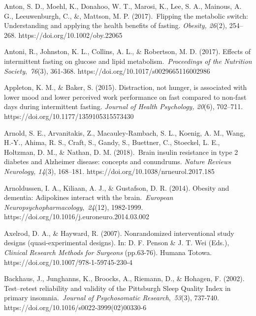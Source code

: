 \documentclass[authordate, empirical]{jote-new-article}
\begin{document}
Anton, S. D., Moehl, K., Donahoo, W. T., Marosi, K., Lee, S. A., Mainous, A. G., Leeuwenburgh, C., \&, Mattson, M. P. (2017). Flipping the metabolic switch: Understanding and applying the health benefits of fasting.\emph{ Obesity, 26}(2),\emph{ }254--268. https://doi.org/10.1002/oby.22065



Antoni, R., Johnston, K. L., Collins, A. L., \& Robertson, M. D. (2017). Effects of intermittent fasting on glucose and lipid metabolism. \emph{Proceedings of the Nutrition Society}, \emph{76}(3), 361-368. https://doi.org/10.1017/s0029665116002986



Appleton, K. M., \& Baker, S. (2015).\emph{ }Distraction, not hunger, is associated with lower mood and lower perceived work performance on fast compared to non-fast days during intermittent fasting.\emph{ Journal of Health Psychology, 20}(6), 702--711.\emph{ }https://doi.org/10.1177/1359105315573430\emph{ }



Arnold, S. E., Arvanitakis, Z., Macauley-Rambach, S. L., Koenig, A. M., Wang, H.-Y., Ahima, R. S., Craft, S., Gandy, S., Buettner, C., Stoeckel, L. E., Holtzman, D. M., \& Nathan, D. M. (2018). Brain insulin resistance in type 2 diabetes and Alzheimer disease: concepts and conundrums.\emph{ Nature Reviews Neurology, 14}(3),\emph{ }168--181\emph{. }https://doi.org/10.1038/nrneurol.2017.185



Arnoldussen, I. A., Kiliaan, A. J., \& Gustafson, D. R. (2014). Obesity and dementia: Adipokines interact with the brain. \emph{European Neuropsychopharmacology}, \emph{24}(12), 1982-1999. https://doi.org/10.1016/j.euroneuro.2014.03.002



Axelrod, D. A., \& Hayward, R. (2007). Nonrandomized interventional study designs (quasi-experimental designs). In: D. F. Penson \& J. T. Wei (Eds.), \emph{Clinical Research Methods for Surgeons} (pp.63-76). Humana Totowa. https://doi.org/10.1007/978-1-59745-230-4



Backhaus, J., Junghanns, K., Broocks, A., Riemann, D., \& Hohagen, F. (2002). Test--retest reliability and validity of the Pittsburgh Sleep Quality Index in primary insomnia. \emph{Journal of Psychosomatic Research}, \emph{53}(3), 737-740. https://doi.org/10.1016/s0022-3999(02)00330-6
\end{document}
